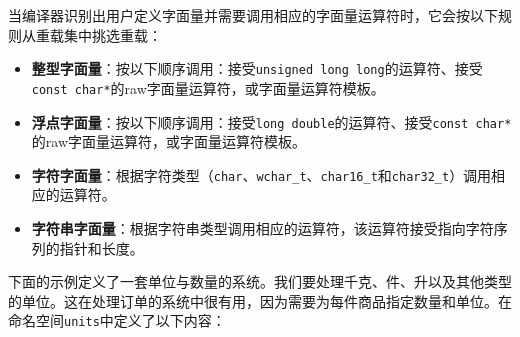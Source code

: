 
当编译器识别出用户定义字面量并需要调用相应的字面量运算符时，它会按以下规则从重载集中挑选重载：



\begin{itemize}
\item \textbf{整型字面量}：按以下顺序调用：接受\texttt{unsigned long long}的运算符、接受\texttt{const char*}的raw字面量运算符，或字面量运算符模板。



\item \textbf{浮点字面量}：按以下顺序调用：接受\texttt{long double}的运算符、接受\texttt{const char*}的raw字面量运算符，或字面量运算符模板。



\item \textbf{字符字面量}：根据字符类型（\texttt{char}、\texttt{wchar\_\allowbreak{}t}、\texttt{char16\_\allowbreak{}t}和\texttt{char32\_\allowbreak{}t}）调用相应的运算符。



\item \textbf{字符串字面量}：根据字符串类型调用相应的运算符，该运算符接受指向字符序列的指针和长度。

\end{itemize}



下面的示例定义了一套单位与数量的系统。我们要处理千克、件、升以及其他类型的单位。这在处理订单的系统中很有用，因为需要为每件商品指定数量和单位。在命名空间\texttt{units}中定义了以下内容：



